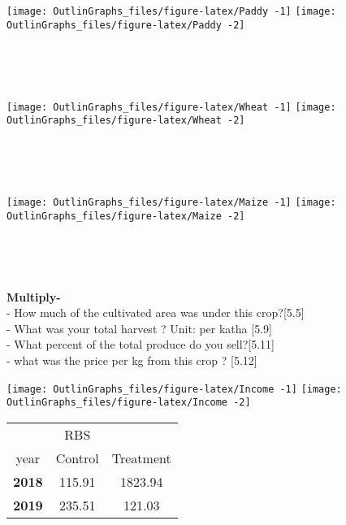 \documentclass[
]{article}
\begin{document}
~

~

\noindent {}

\texttt{[image: OutlinGraphs\_files/figure-latex/Paddy -1]}
\texttt{[image: OutlinGraphs\_files/figure-latex/Paddy -2]}

~

~

\noindent {}

\texttt{[image: OutlinGraphs\_files/figure-latex/Wheat -1]}
\texttt{[image: OutlinGraphs\_files/figure-latex/Wheat -2]}

~

~

\noindent {}

\texttt{[image: OutlinGraphs\_files/figure-latex/Maize -1]}
\texttt{[image: OutlinGraphs\_files/figure-latex/Maize -2]}

~

~

\noindent {}

\textbf{Multiply-}\\
- How much of the cultivated area was under this crop?{[}5.5{]}\\
- What was your total harvest ? Unit: per katha {[}5.9{]}\\
- What percent of the total produce do you sell?{[}5.11{]}\\
- what was the price per kg from this crop ? {[}5.12{]}

\texttt{[image: OutlinGraphs\_files/figure-latex/Income -1]}
\texttt{[image: OutlinGraphs\_files/figure-latex/Income -2]}

\begin{table}[H]
\centering
\begin{tabular}{>{}ccc}
\toprule
\multicolumn{1}{c}{ } & \multicolumn{1}{c}{RBS} & \multicolumn{1}{c}{ } \\
\cmidrule(l{3pt}r{3pt}){2-2}
year & Control & Treatment\\
\midrule
\textbf{2018} & 115.91 & 1823.94\\
\cmidrule{1-3}
\textbf{2019} & 235.51 & 121.03\\
\bottomrule
\end{tabular}
\end{table}
\end{document}
